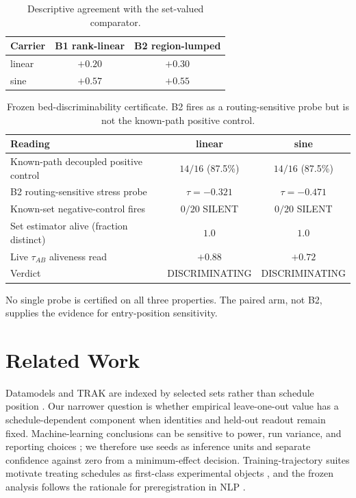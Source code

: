\documentclass{article}
\begin{document}
\begin{table}[H]
\centering\small
\caption{Descriptive agreement with the set-valued comparator.}
\label{tab:agreement}
\begin{tabular}{lcc}
\toprule
Carrier & B1 rank-linear & B2 region-lumped \\
\midrule
linear & $+0.20$ & $+0.30$ \\
sine & $+0.57$ & $+0.55$ \\
\bottomrule
\end{tabular}
\end{table}

\begin{table}[H]
\centering\footnotesize
\caption{Frozen bed-discriminability certificate. B2 fires as a routing-sensitive probe but is not
the known-path positive control.}
\label{tab:certificate}
\begin{tabularx}{\linewidth}{@{}Xcc@{}}
\toprule
Reading & linear & sine \\
\midrule
Known-path decoupled positive control & $14/16$ (87.5\%) & $14/16$ (87.5\%) \\
B2 routing-sensitive stress probe & $\tau=-0.321$ & $\tau=-0.471$ \\
Known-set negative-control fires & $0/20$ SILENT & $0/20$ SILENT \\
Set estimator alive (fraction distinct) & $1.0$ & $1.0$ \\
Live $\tau_{AB}$ aliveness read & $+0.88$ & $+0.72$ \\
Verdict & DISCRIMINATING & DISCRIMINATING \\
\bottomrule
\end{tabularx}
\end{table}

No single probe is certified on all three properties. The paired arm, not B2, supplies the evidence
for entry-position sensitivity.

\FloatBarrier
\section{Related Work}
Datamodels and TRAK are indexed by selected sets rather than schedule position
\citep{ilyas2022datamodels,park2023trak}. Our narrower question is whether empirical leave-one-out
value has a schedule-dependent component when identities and held-out readout remain fixed.
Machine-learning conclusions can be sensitive to power, run variance, and reporting choices
\citep{card2020power,bouthillier2021variance,dodge2019show,reimers2017reporting}; we therefore use
seeds as inference units and separate confidence against zero from a minimum-effect decision.
Training-trajectory suites motivate treating schedules as first-class experimental objects
\citep{biderman2023pythia}, and the frozen analysis follows the rationale for preregistration in NLP
\citep{vanmiltenburg2021preregistering}.
\end{document}
